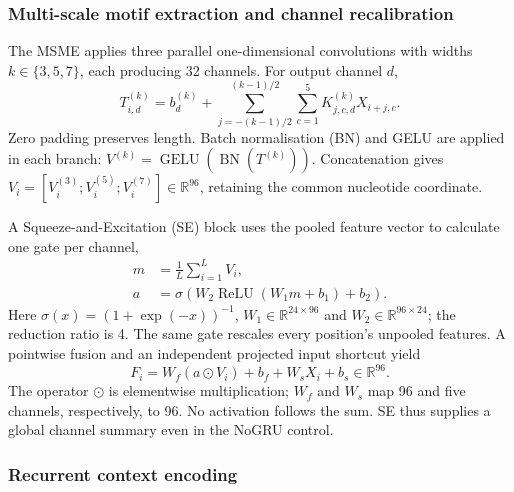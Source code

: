 \documentclass[webpdf,contemporary,large]{oup-authoring-template}
\begin{document}
\subsubsection{Multi-scale motif extraction and channel recalibration}\label{subsec:blocks}

The MSME applies three parallel one-dimensional convolutions with widths $k\in\{3,5,7\}$, each producing 32 channels. For output channel $d$,
\begin{equation}
T^{(k)}_{i,d}=b^{(k)}_d+
\sum_{j=-(k-1)/2}^{(k-1)/2}\sum_{c=1}^{5}
K^{(k)}_{j,c,d}X_{i+j,c}.
\label{eq:multiscale_convolution}
\end{equation}
Zero padding preserves length. Batch normalisation (BN) and GELU are applied in each branch:
$V^{(k)}=\operatorname{GELU}(\operatorname{BN}(T^{(k)}))$.
Concatenation gives $V_i=[V_i^{(3)};V_i^{(5)};V_i^{(7)}]\in\mathbb R^{96}$, retaining the common nucleotide coordinate.

A Squeeze-and-Excitation (SE) block \citep{hu2018senet} uses the pooled feature vector to calculate one gate per channel,
\begin{equation}
\begin{aligned}
m&=\frac1L\sum_{i=1}^{L}V_i,\\
a&=\sigma\!\left(W_2\operatorname{ReLU}(W_1m+b_1)+b_2\right).
\end{aligned}
\label{eq:se_gate}
\end{equation}
Here $\sigma(x)=(1+\exp(-x))^{-1}$, $W_1\in\mathbb R^{24\times96}$ and $W_2\in\mathbb R^{96\times24}$; the reduction ratio is 4. The same gate rescales every position's unpooled features. A pointwise fusion and an independent projected input shortcut \citep{he2016resnet} yield
\begin{equation}
F_i=W_f(a\odot V_i)+b_f+W_sX_i+b_s
\in\mathbb R^{96}.
\label{eq:motif_residual}
\end{equation}
The operator $\odot$ is elementwise multiplication; $W_f$ and $W_s$ map 96 and five channels, respectively, to 96. No activation follows the sum. SE thus supplies a global channel summary even in the NoGRU control.

\subsubsection{Recurrent context encoding}
\end{document}
